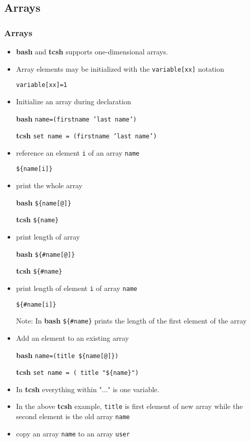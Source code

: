\documentclass[10pt,t]{beamer}
\begin{document}
\subsection{Arrays}
\begin{frame}
  \frametitle{Arrays}
  \begin{itemize}
    \item \textbf{bash} and \textbf{tcsh} supports one-dimensional arrays.
    \item Array elements may be initialized with the \texttt{variable[xx]} notation
    \item[] \texttt{variable[xx]=1}
    \item Initialize an array during declaration
    \item[\textbf{bash}] \texttt{name=(firstname 'last name')}
    \item[\textbf{tcsh}] \texttt{set name = (firstname 'last name')}
    \item reference an element \texttt{i} of an array \texttt{name}
    \item[] \texttt{\$\{name[i]\}}
    \item print the whole array
    \item[\textbf{bash}] \texttt{\$\{name[@]\}}
    \item[\textbf{tcsh}] \texttt{\$\{name\}}
    \item print length of array
    \item[\textbf{bash}] \texttt{\$\{\#name[@]\}}
    \item[\textbf{tcsh}] \texttt{\$\{\#name\}}
      \framebreak
    \item print length of element \texttt{i} of array \texttt{name}
    \item[] \texttt{\$\{\#name[i]\}}
    \item[] Note: In \textbf{bash} \texttt{\$\{\#name\}} prints the length of the first element of the array
    \item Add an element to an existing array
    \item[\textbf{bash}] \texttt{name=(title \$\{name[@]\})}
    \item[\textbf{tcsh}] \texttt{set name = ( title  "\$\{name\}")}
    \item In \textbf{tcsh} everything within "..." is one variable.
    \item In the above \textbf{tcsh} example, \texttt{title} is first element of new array while the second element is the old array \texttt{name}
    \item copy an array \texttt{name} to an array \texttt{user}

\end{itemize}
\end{frame}
\end{document}
